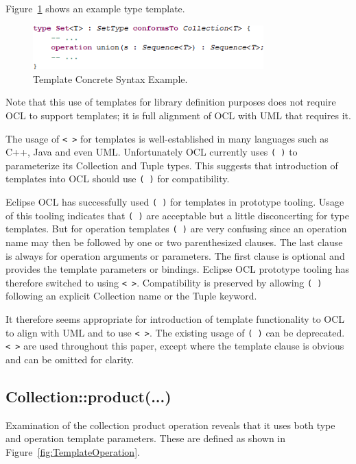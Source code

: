 \documentclass{eceasst}
\begin{document}
Figure~\ref{fig:TemplateExample} shows an example type template.

\begin{figure}
  \begin{center}
    \includegraphics[width=3.5in]{TemplateExample.png}
  \end{center}
  \caption{Template Concrete Syntax Example.}
  \label{fig:TemplateExample}
\end{figure}

Note that this use of templates for library definition purposes does not require OCL to support templates; it is full alignment of OCL with UML that requires it.

The usage of \verb|< >| for templates is well-established in many languages such as C++, Java and even UML. Unfortunately OCL currently uses \verb|( )| to parameterize its Collection and Tuple types. This suggests that introduction of templates into OCL should use \verb|( )| for compatibility.

Eclipse OCL has successfully used \verb|( )| for templates in prototype tooling. Usage of this tooling indicates that \verb|( )| are acceptable but a little disconcerting for type templates. But for operation templates \verb|( )| are very confusing since an operation name may then be followed by one or two parenthesized clauses. The last clause is always for operation arguments or parameters. The first clause is optional and provides the template parameters or bindings. Eclipse OCL prototype tooling has therefore switched to using \verb|< >|. Compatibility is preserved by allowing \verb|( )| following an explicit Collection name or the Tuple keyword.

It therefore seems appropriate for introduction of template functionality to OCL to align with UML and to use \verb|< >|. The existing usage of \verb|( )| can be deprecated. \verb|< >| are used throughout this paper, except where the template clause is obvious and can be omitted for clarity.  

\subsection{Collection::product(...)}

Examination of the collection product operation reveals that it uses both type and operation template parameters. These are defined as shown in Figure~\ref{fig:TemplateOperation}.
\end{document}
